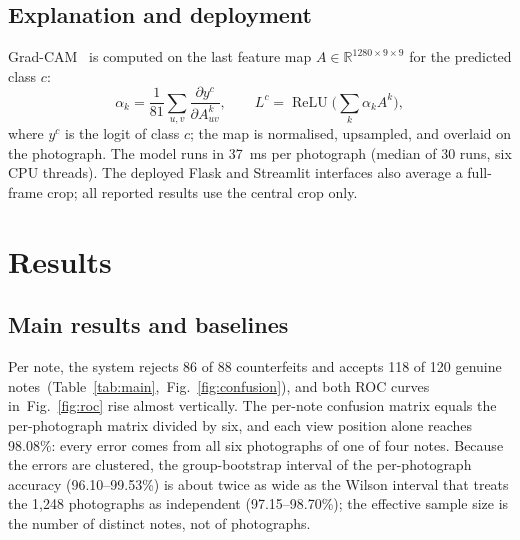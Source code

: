 \documentclass[pdflatex,sn-mathphys-num]{sn-jnl}
\begin{document}
\subsection{Explanation and deployment}\label{sec:deploy}

Grad-CAM~\cite{selvaraju2017gradcam} is computed on the last feature map
$A\in\mathbb{R}^{1280\times9\times9}$ for the predicted class $c$:
\begin{equation}
\alpha_k = \frac{1}{81}\sum_{u,v}\frac{\partial y^{c}}{\partial A^{k}_{uv}},\qquad
L^{c} = \operatorname{ReLU}\!\Big(\sum_{k}\alpha_k A^{k}\Big),
\label{eq:gradcam}
\end{equation}
where $y^c$ is the logit of class $c$; the map is normalised, upsampled, and overlaid on
the photograph. The model runs in 37~ms per photograph (median of 30 runs, six CPU
threads). The deployed Flask and Streamlit interfaces also average a full-frame crop;
all reported results use the central crop only.

\section{Results}\label{sec:results}

\subsection{Main results and baselines}\label{sec:main}

Per note, the system rejects 86 of 88 counterfeits and accepts 118 of 120 genuine notes~(Table~\ref{tab:main},~Fig.~\ref{fig:confusion}), and both ROC curves in~Fig.~\ref{fig:roc} rise almost vertically. The per-note confusion matrix equals the
per-photograph matrix divided by six, and each view position alone reaches 98.08\%:
every error comes from all six photographs of one of four notes. Because the errors are
clustered, the group-bootstrap interval of the per-photograph accuracy (96.10--99.53\%)
is about twice as wide as the Wilson interval that treats the 1{,}248 photographs as
independent (97.15--98.70\%); the effective sample size is the number of distinct notes,
not of photographs.
\end{document}
